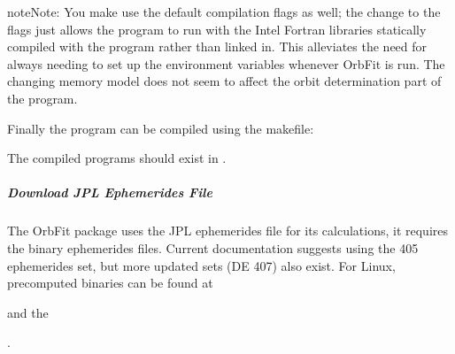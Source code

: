 \documentclass[letterpaper,11pt,english]{sphinxmanual}
\begin{document}
\begin{sphinxVerbatim}[commandchars=\\\{\}]
         
\end{sphinxVerbatim}

\begin{sphinxadmonition}{note}{Note:}
\sphinxAtStartPar
You make use the default compilation flags as well; the change to the
flags just allows the program to run with the Intel Fortran libraries
statically compiled with the program rather than linked in. This alleviates
the need for always needing to set up the environment variables whenever
OrbFit is run. The changing memory model does not seem to affect the orbit
determination part of the program.
\end{sphinxadmonition}

\sphinxAtStartPar
Finally the program can be compiled using the makefile:

\begin{sphinxVerbatim}[commandchars=\\\{\}]
\end{sphinxVerbatim}

\sphinxAtStartPar
The compiled programs should exist in .


\subparagraph{Download JPL Ephemerides File}
\label{\detokenize{technical/installation/orbfit:download-jpl-ephemerides-file}}
\sphinxAtStartPar
The OrbFit package uses the JPL ephemerides file for its calculations, it
requires the binary ephemerides files. Current documentation suggests using
the 405 ephemerides set, but more updated sets (DE 407) also exist. For Linux,
precomputed binaries can be found at %
\begin{footnote}[40]\sphinxAtStartFootnote
{}
%
\end{footnote}
and the %
\begin{footnote}[41]\sphinxAtStartFootnote
{}
%
\end{footnote}.
\end{document}
